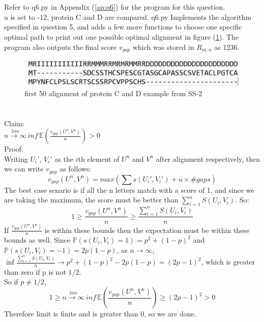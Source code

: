 \documentclass{article}
\begin{document}
	\section{}
	Refer to q6.py in Appendix (\ref{ap:q6}) for the program for this question.\\
	u is set to -12, protein C and D are compared.
	q6.py Implements the algorithm specified in question 5, and adds a few more functions to choose one specific optimal path to print out one possible optimal alignment in figure (\ref{fig:Q6_1}). The program also outputs the final score $ v_{gap} $ which was stored in $ R_{m, n} $ as 1236.
	
	\begin{figure}[h]
		\centering
		\includegraphics{figures/q6_1.jpg}
		\caption{first 50 alignment of protein C and D example from SS-2}
		\label{fig:Q6_1}
		
	\end{figure}
	
	\section{}
	Claim:\\
	$\stackrel{lim}{n \rightarrow \infty}\, inf\, \mathbb{E}(\frac{v_{gap}(U^n, V^n)}{n}) > 0 $\\
	Proof:\\
	Writing $ U_i' $, $ V_i' $ as the $ i $th element of $ U^n $ and $ V^n $ after alignment respectively, then we can write $ v_{gap} $ as follows:
	\[v_{gap}(U^n, V^n) = max(\sum s(U_i', V_i') + u \times \# gaps)\]
	The best case senario is if all the n letters match with a score of 1, and since we are taking the maximum, the score must be better than $\sum_{i = 1}^{n} S(U_i, V_i)$. So:
	\[1 \geq \frac{v_{gap}(U^n, V^n)}{n} \geq \frac{\sum_{i = 1}^{n} S(U_i, V_i)}{n}\]
	If $ \frac{v_{gap}(U^n, V^n)}{n} $ is within these bounds then the expectation must be within these bounds as well.
	Since $ \mathbb{P}(s(U_i, V_i) = 1) = p^2 + (1-p)^2 $ and $ \mathbb{P}(s(U_i, V_i) = -1) = 2p(1-p) $, as $ n \rightarrow \infty $, $ \inf \frac{\sum_{i = 1}^{n} S(U_i, V_i)}{n} \rightarrow p^2 + (1-p)^2 - 2p(1-p) = (2p-1)^2$, which is greater than zero if p is not $ 1/2 $.\\
	So if $ p \neq 1/2 $, 
	\[1 \geq \stackrel{lim}{n \rightarrow \infty} \, inf \, \mathbb{E} (\frac{v_{gap}(U^n, V^n)}{n}) \geq (2p-1)^2 > 0\]
	Therefore limit is finite and is greater than 0, so we are done.
	
\end{document}

